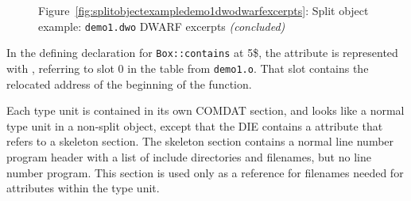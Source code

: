\begin{figure}
\begin{center}
\vspace{3mm}
Figure~\ref{fig:splitobjectexampledemo1dwodwarfexcerpts}: Split object example: \texttt{demo1.dwo} DWARF excerpts \textit{(concluded)}
\end{center}
\end{figure}

In the defining declaration for \texttt{Box::contains} at 5\$, the
\DWATlowpc{} attribute is represented with \DWFORMaddrx,
referring to slot 0 in the \dotdebugaddr{} table from \texttt{demo1.o}.
That slot contains the relocated address of the beginning of the
function.

Each type unit is contained in its own COMDAT \dotdebuginfodwo{}
section, and looks like a normal type unit in a non-split object,
except that the \DWTAGtypeunit{} DIE contains a \DWATstmtlist{}
attribute that refers to a skeleton \dotdebuglinedwo{} section. The
skeleton \dotdebuglinedwo{} section contains a normal line number
program header with a list of include directories and filenames,
but no line number program. This section is used only as a
reference for filenames needed for \DWATdeclfile{} attributes
within the type unit.

